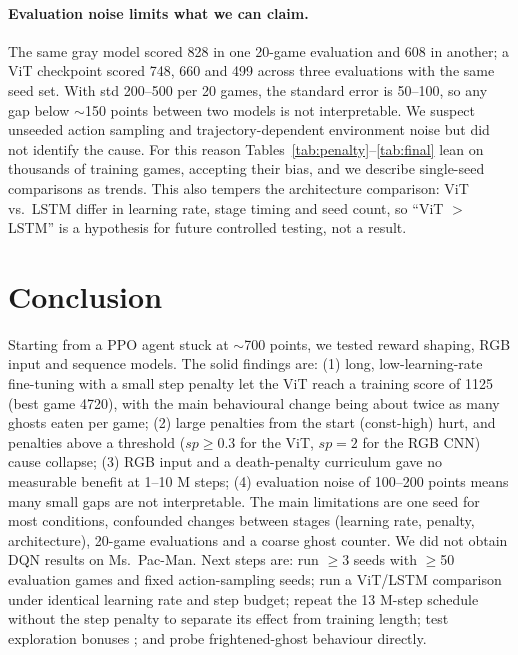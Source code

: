 \documentclass[11pt]{article}
\newcommand{\spen}{\textit{sp}}
\begin{document}
\paragraph{Evaluation noise limits what we can claim.} The same gray model scored 828 in one 20-game evaluation and 608 in another; a ViT checkpoint scored 748, 660 and 499 across three evaluations with the same seed set. With std 200--500 per 20 games, the standard error is 50--100, so any gap below $\sim$150 points between two models is not interpretable. We suspect unseeded action sampling and trajectory-dependent environment noise but did not identify the cause. For this reason Tables~\ref{tab:penalty}--\ref{tab:final} lean on thousands of training games, accepting their bias, and we describe single-seed comparisons as trends. This also tempers the architecture comparison: ViT vs.\ LSTM differ in learning rate, stage timing and seed count, so ``ViT $>$ LSTM'' is a hypothesis for future controlled testing, not a result.

\section{Conclusion}
\label{sec:conclusion}
Starting from a PPO agent stuck at $\sim$700 points, we tested reward shaping, RGB input and sequence models. The solid findings are: (1) long, low-learning-rate fine-tuning with a small step penalty let the ViT reach a training score of 1125 (best game 4720), with the main behavioural change being about twice as many ghosts eaten per game; (2) large penalties from the start (const-high) hurt, and penalties above a threshold ($\spen\ge0.3$ for the ViT, $\spen=2$ for the RGB CNN) cause collapse; (3) RGB input and a death-penalty curriculum gave no measurable benefit at 1--10 M steps; (4) evaluation noise of 100--200 points means many small gaps are not interpretable. The main limitations are one seed for most conditions, confounded changes between stages (learning rate, penalty, architecture), 20-game evaluations and a coarse ghost counter. We did not obtain DQN results on Ms.\ Pac-Man. Next steps are: run $\ge$3 seeds with $\ge$50 evaluation games and fixed action-sampling seeds; run a ViT/LSTM comparison under identical learning rate and step budget; repeat the 13 M-step schedule without the step penalty to separate its effect from training length; test exploration bonuses \citep{burda2019rnd}; and probe frightened-ghost behaviour directly.
\end{document}
